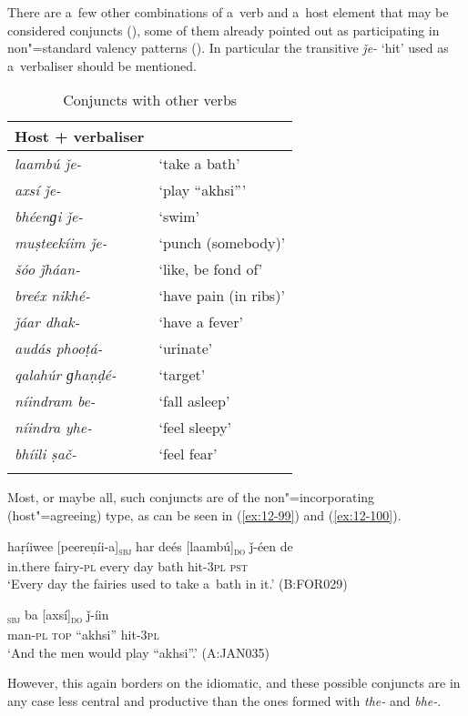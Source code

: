  There are a~few other combinations of a~verb and a~host element that may be considered conjuncts (), some of them already pointed out as participating in non"=standard valency patterns (). In particular the transitive \textit{ǰe-} `hit' used as a~verbaliser should be mentioned.


\begin{table}[ht]
\caption{Conjuncts with other verbs}
\begin{tabularx}{.75\textwidth}{ l@{\hspace{45pt}} Q }
\lspbottomrule
\textbf{Host + verbaliser} &
\\\hline
\textit{laambú ǰe-} &
`take a bath'\\
\textit{axsí ǰe-} &
`play ``akhsi'''\\
\textit{bhéenɡi ǰe-} &
`swim'\\
\textit{muṣteekíim ǰe-} &
`punch (somebody)'\\
\textit{šóo ǰháan-} &
`like, be fond of'\\
\textit{breéx nikhé-} &
`have pain (in ribs)'\\
\textit{ǰáar dhak-} &
`have a fever'\\
\textit{audás phooṭá-} &
`urinate'\\
\textit{qalahúr ɡhaṇḍé-} &
`target'\\
\textit{níindram be-} &
`fall asleep'\\
\textit{níindra yhe-} &
`feel sleepy'\\
\textit{bhíili ṣač-} &
`feel fear'\\\lspbottomrule
\end{tabularx}
\label{tab:12-9}
\end{table}


Most, or maybe all, such conjuncts are of the non"=incorporating (host"=agreeing) type, as can be seen in (\ref{ex:12-99}) and (\ref{ex:12-100}). 

\begin{exe}
\ex
\label{ex:12-99}
\gll haṛíiwee [peereṇíi-a]\textsubscript{\textsc{sbj}} har deés [laambú]\textsubscript{\textsc{do}} ǰ-éen de \\
in.there fairy-\textsc{pl} every day bath hit-\textsc{3pl} \textsc{pst} \\
\glt `Every day the fairies used to take a~bath in it.' (B:FOR029)
\end{exe}
\begin{exe}
\ex
\label{ex:12-100}
\gll [míiš-a]\textsubscript{\textsc{sbj}} ba [axsí]\textsubscript{\textsc{do}} ǰ-íin  \\
man-\textsc{pl} \textsc{top} ``akhsi'' hit-\textsc{3pl} \\
\glt `And the men would play ``akhsi''.' (A:JAN035)
\end{exe}

However, this again borders on the idiomatic, and these possible conjuncts are in any case less central and productive than the ones formed with \textit{the-} and \textit{bhe-}.